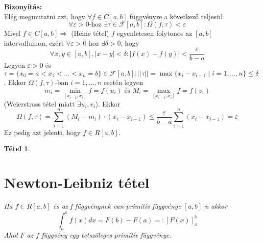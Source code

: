 \documentclass{article}
\newtheorem{theorem}{Tétel}
\renewenvironment{proof}{\textbf{Bizonyítás:} \\}{\hfill}
\begin{document}
\begin{proof}
Elég megmutatni azt, hogy $\forall f \in C[a,b]$ függvényre a következő teljesül:
\begin{equation*}
    \forall \varepsilon >0\textrm{-hoz }\exists\tau \in \mathcal{F}[a,b]:\Omega(f,\tau)<\varepsilon
\end{equation*}
Mivel $f\in C[a,b]\Longrightarrow$ (Heine tétel) $f$ egyenletesen folytonos az $[a,b]$ intervallumon, ezért $\forall \varepsilon > 0$-hoz $\exists \delta > 0$, hogy
\begin{equation*}
    \forall x,y \in [a,b], |x-y|< \delta:|f(x)-f(y)|<\frac{\varepsilon}{b-a}
\end{equation*}
Legyen $\varepsilon > 0$ és $\tau = \{x_0 = a < x_1 < \dots < x_n = b\} \in \mathcal{F}[a,b]: ||\tau||=\max\{x_i-x_{i-1} \mid i = 1,\dots,n\}\leq \delta$. Ekkor $\Omega(f,\tau)$-ban $i=1,\dots,n$ esetén legyen
\begin{equation*}
    m_i=\min_{[x_{i-1},x_i]}f=f(u_i)\textrm{ és }M_i=\max_{[x_{i-1},x_i]}f=f(v_i)
\end{equation*}
(Weierstrass tétel miatt $\exists u_i,v_i$). Ekkor
\begin{equation*}
    \Omega(f,\tau)=\sum_{i=1}^n(M_i-m_i)\cdot(x_i-x_{i-1})\leq \frac{\varepsilon}{b-a}\sum_{i=1}^n(x_i-x_{i-1})=\varepsilon
\end{equation*}
Ez pedig azt jelenti, hogy $f\in R[a,b]$.
\end{proof}
\newpage
\begin{theorem}
\section{Newton-Leibniz tétel} 
Ha $f\in R[a,b]$ és az f függvénynek van primitív függvénye $[a,b]$-n akkor
\begin{equation*}
    \int_a^bf(x) dx=F(b)-F(a)=:\left[F(x)\right]^b_a
\end{equation*}
Ahol $F$ az $f$ függvény egy tetszőleges primitív függvénye.
\end{theorem}
\end{document}
